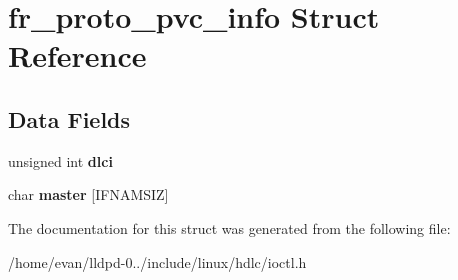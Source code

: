 \section{fr\-\_\-proto\-\_\-pvc\-\_\-info \-Struct \-Reference}
\label{structfr__proto__pvc__info}
\subsection*{\-Data \-Fields}
\begin{DoxyCompactItemize}
\item 
unsigned int {\bfseries dlci}\label{structfr__proto__pvc__info_acf255689081f8f00cf5b1d9f6904c30f}

\item 
char {\bfseries master} [\-I\-F\-N\-A\-M\-S\-I\-Z]\label{structfr__proto__pvc__info_a07157f044c928d18e3d243d35dbac501}

\end{DoxyCompactItemize}


\-The documentation for this struct was generated from the following file\-:\begin{DoxyCompactItemize}
\item 
/home/evan/lldpd-\/0../include/linux/hdlc/ioctl.\-h\end{DoxyCompactItemize}
